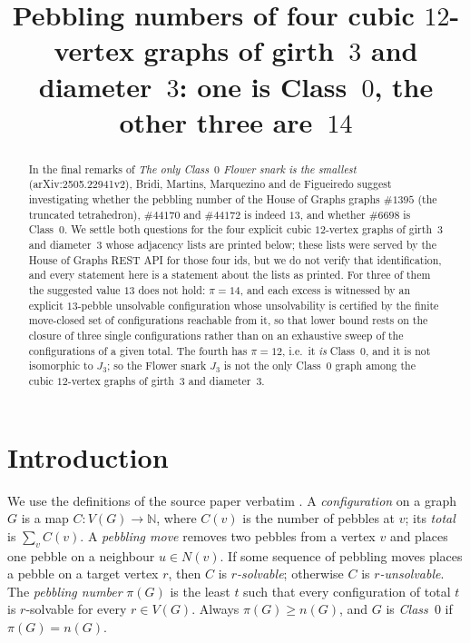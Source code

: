 \documentclass[11pt]{amsart}
\title[Four cubic $12$-vertex graphs: one Class~$0$, three with $\pi=14$]
{Pebbling numbers of four cubic $12$-vertex graphs of girth~$3$ and
 diameter~$3$: one is Class~$0$, the other three are~$14$}
\date{}
\theoremstyle{remark}
\newcommand{\HoG}[1]{\#\mathrm{#1}}
\begin{document}
\begin{abstract}
In the final remarks of \emph{The only Class~$0$ Flower snark is the smallest}
(arXiv:2505.22941v2), Bridi, Martins, Marquezino and de Figueiredo suggest
investigating whether the pebbling number of the House of Graphs graphs
$\HoG{1395}$ (the truncated tetrahedron), $\HoG{44170}$ and $\HoG{44172}$ is
indeed $13$, and whether $\HoG{6698}$ is Class~$0$. We settle both questions for
the four explicit cubic $12$-vertex graphs of girth~$3$ and diameter~$3$ whose
adjacency lists are printed below; these lists were served by the House of Graphs
REST API for those four ids, but we do not verify that identification, and every
statement here is a statement about the lists as printed. For three of them the
suggested value $13$ does not hold: $\pi=14$, and each excess is witnessed by an
explicit $13$-pebble unsolvable configuration whose unsolvability is certified by
the finite move-closed set of configurations reachable from it, so that lower
bound rests on the closure of three single configurations rather than on an
exhaustive sweep of the configurations of a given total. The fourth has
$\pi=12$, i.e.\ it \emph{is} Class~$0$, and it is not isomorphic to $J_3$; so the
Flower snark $J_3$ is not the only Class~$0$ graph among the cubic $12$-vertex
graphs of girth~$3$ and diameter~$3$.
\end{abstract}

\maketitle

\section{Introduction}

We use the definitions of the source paper verbatim \cite[\S2]{BMMF}. A
\emph{configuration} on a graph $G$ is a map $C\colon V(G)\to\mathbb{N}$, where
$C(v)$ is the number of pebbles at $v$; its \emph{total} is $\sum_v C(v)$. A
\emph{pebbling move} removes two pebbles from a vertex $v$ and places one pebble
on a neighbour $u\in N(v)$. If some sequence of pebbling moves places a pebble on
a target vertex $r$, then $C$ is \emph{$r$-solvable}; otherwise $C$ is
\emph{$r$-unsolvable}. The \emph{pebbling number} $\pi(G)$ is the least $t$ such
that every configuration of total $t$ is $r$-solvable for every $r\in V(G)$.
Always $\pi(G)\ge n(G)$, and $G$ is \emph{Class~$0$} if $\pi(G)=n(G)$.
\end{document}
